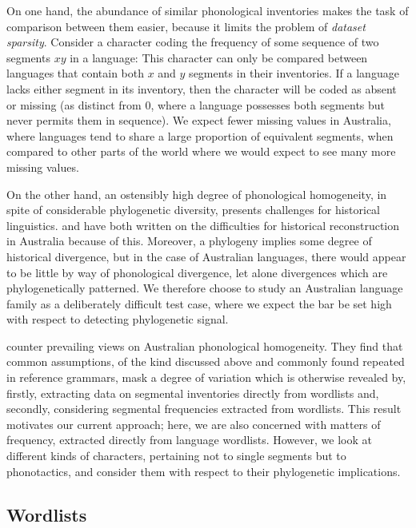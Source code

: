 On one hand, the abundance of similar phonological inventories makes the task of comparison between them easier, because it limits the problem of \emph{dataset sparsity}. Consider a character coding the frequency of some sequence of two segments \(xy\) in a language: This character can only be compared between languages that contain both \(x\) and \(y\) segments in their inventories. If a language lacks either segment in its inventory, then the character will be coded as absent or missing (as distinct from 0, where a language possesses both segments but never permits them in sequence). We expect fewer missing values in Australia, where languages tend to share a large proportion of equivalent segments, when compared to other parts of the world where we would expect to see many more missing values.

On the other hand, an ostensibly high degree of phonological homogeneity, in spite of considerable phylogenetic diversity, presents challenges for historical linguistics. \textcite[p.~141]{baker_word_2014} and \textcite[p.~103]{alpher_pama-nyungan:_2004} have both written on the difficulties for historical reconstruction in Australia because of this. Moreover, a phylogeny implies some degree of historical divergence, but in the case of Australian languages, there would appear to be little by way of phonological divergence, let alone divergences which are phylogenetically patterned. We therefore choose to study an Australian language family as a deliberately difficult test case, where we expect the bar be set high with respect to detecting phylogenetic signal.

\textcite{gasser_revisiting_2014} counter prevailing views on Australian phonological homogeneity. They find that common assumptions, of the kind discussed above and commonly found repeated in reference grammars, mask a degree of variation which is otherwise revealed by, firstly, extracting data on segmental inventories directly from wordlists and, secondly, considering segmental frequencies extracted from wordlists. This result motivates our current approach; here, we are also concerned with matters of frequency, extracted directly from language wordlists. However, we look at different kinds of characters, pertaining not to single segments but to phonotactics, and consider them with respect to their phylogenetic implications.

\hypertarget{wordlists}{%
\subsection{Wordlists}\label{wordlists}}

